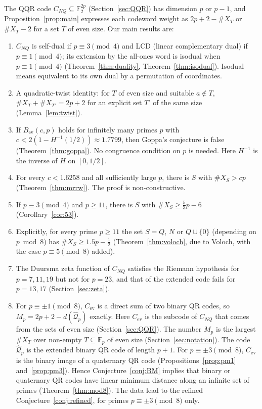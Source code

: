 \documentclass[12pt,letterpaper]{article}
\theoremstyle{definition}
\theoremstyle{remark}
\numberwithin{equation}{section}
\newcommand{\F}{\mathbb{F}}
\newcommand{\Fp}{\mathbb{F}_p}
\newcommand{\CNQ}{C_{NQ}}
\newcommand{\Cev}{C_{\mathrm{ev}}}
\newcommand{\X}{\#X}
\begin{document}
The QQR code $\CNQ\subseteq\F_2^{2p}$ (Section~\ref{sec:QQR}) has dimension $p$ or
$p-1$, and Proposition~\ref{prop:main} expresses each codeword weight as
$2p+2-\X_T$ or $\X_T-2$ for a set $T$ of even size. Our main results are:
\begin{enumerate}
\item $\CNQ$ is self-dual if $p\equiv3\pmod 4$ and LCD (linear complementary dual)
if $p\equiv1\pmod4$; its extension by the all-ones word is isodual when
$p\equiv 1\pmod 4$ (Theorem~\ref{thm:duality}, Theorem~\ref{thm:isodual}).
Isodual means equivalent to its own dual by a permutation of coordinates.
\item A quadratic-twist identity: for $T$ of even size and suitable $a\notin T$,
$\X_T+\X_{T'}=2p+2$ for an explicit set $T'$ of the same size
(Lemma~\ref{lem:twist}).
\item If $B_{\mathrm{ev}}(c,p)$ holds for infinitely many primes $p$ with
$c<2(1-H^{-1}(1/2))\approx1.7799$, then Goppa's conjecture is false
(Theorem~\ref{thm:goppa}). No congruence condition on $p$ is needed. Here
$H^{-1}$ is the inverse of $H$ on $[0,1/2]$.
\item For every $c<1.6258$ and all sufficiently large $p$, there is $S$ with
$\X_S>cp$ (Theorem~\ref{thm:mrrw}). The proof is non-constructive.
\item If $p\equiv3\pmod4$ and $p\ge11$, there is $S$ with
$\X_S\ge\frac53p-6$ (Corollary~\ref{cor:53}).
\item\label{item:voloch} Explicitly, for every prime $p\ge 11$ the set $S=Q$, $N$ or $Q\cup\{0\}$
(depending on $p\bmod 8$) has $\X_S\ge 1.5p-\frac12$
(Theorem~\ref{thm:voloch}, due to Voloch, with the case $p\equiv5\pmod 8$ added).
\item The Duursma zeta function of $\CNQ$ satisfies the Riemann hypothesis for
$p=7,11,19$ but not for $p=23$, and that of the extended code fails for $p=13,17$
(Section~\ref{sec:zeta}).
\item For $p\equiv\pm1\pmod8$, $\Cev$ is a direct sum of two binary QR codes, so
$M_p=2p+2-d(\widehat{\mathcal Q}_p)$ exactly. Here $\Cev$ is the subcode of $\CNQ$
that comes from the sets of even size (Section~\ref{sec:QQR}). The number $M_p$
is the largest $\X_T$ over non-empty $T\subseteq\Fp$ of even size
(Section~\ref{sec:notation}). The code $\widehat{\mathcal Q}_p$ is the extended
binary QR code of length $p+1$. For $p\equiv\pm3\pmod8$, $\Cev$ is
the binary image of a quaternary QR code (Propositions~\ref{prop:pm1}
and~\ref{prop:pm3}). Hence Conjecture~\ref{conj:BM} implies that binary or
quaternary QR codes have linear minimum distance along an infinite set of primes
(Theorem~\ref{thm:mod8}). The data lead to the refined
Conjecture~\ref{conj:refined}, for primes $p\equiv\pm3\pmod8$ only.
\end{enumerate}
\end{document}
